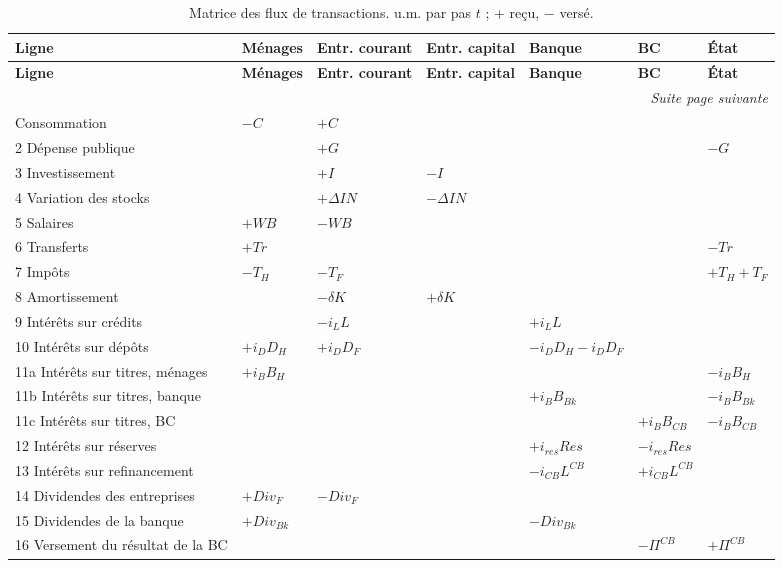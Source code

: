 \documentclass{article}
\begin{document}
\begin{longtable}{lllllll}
\caption{Matrice des flux de transactions. u.m. par pas $t$ ; + reçu, − versé.}\label{tab:matrice-flux}\\
\toprule
\textbf{Ligne} & \textbf{Ménages} & \textbf{Entr. courant} & \textbf{Entr. capital} & \textbf{Banque} & \textbf{BC} & \textbf{État}\\
\midrule
\endfirsthead
\toprule
\textbf{Ligne} & \textbf{Ménages} & \textbf{Entr. courant} & \textbf{Entr. capital} & \textbf{Banque} & \textbf{BC} & \textbf{État}\\
\midrule
\endhead
\midrule
\multicolumn{7}{r}{\emph{Suite page suivante}}\\
\endfoot
\bottomrule
\endlastfoot
1 Consommation & $-C$ & $+C$ & & & & \\
2 Dépense publique & & $+G$ & & & & $-G$\\
3 Investissement & & $+I$ & $-I$ & & & \\
4 Variation des stocks & & $+\Delta \mathit{IN}$ & $-\Delta \mathit{IN}$ & & & \\
5 Salaires & $+\mathit{WB}$ & $-\mathit{WB}$ & & & & \\
6 Transferts & $+\mathit{Tr}$ & & & & & $-\mathit{Tr}$\\
7 Impôts & $-T_H$ & $-T_F$ & & & & $+T_H + T_F$\\
8 Amortissement & & $-\delta K$ & $+\delta K$ & & & \\
9 Intérêts sur crédits & & $-i_L L$ & & $+i_L L$ & & \\
10 Intérêts sur dépôts & $+i_D D_H$ & $+i_D D_F$ & & $-i_D D_H - i_D D_F$ & & \\
11a Intérêts sur titres, ménages & $+i_B B_H$ & & & & & $-i_B B_H$\\
11b Intérêts sur titres, banque & & & & $+i_B B_{Bk}$ & & $-i_B B_{Bk}$\\
11c Intérêts sur titres, BC & & & & & $+i_B B_{CB}$ & $-i_B B_{CB}$\\
12 Intérêts sur réserves & & & & $+i_{res} \mathit{Res}$ & $-i_{res} \mathit{Res}$ & \\
13 Intérêts sur refinancement & & & & $-i_{CB} L^{CB}$ & $+i_{CB} L^{CB}$ & \\
14 Dividendes des entreprises & $+\mathit{Div}_F$ & $-\mathit{Div}_F$ & & & & \\
15 Dividendes de la banque & $+\mathit{Div}_{Bk}$ & & & $-\mathit{Div}_{Bk}$ & & \\
16 Versement du résultat de la BC & & & & & $-\Pi^{CB}$ & $+\Pi^{CB}$\\

\end{longtable}
\end{document}
